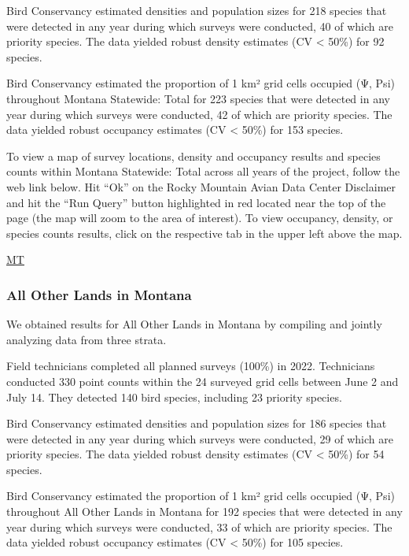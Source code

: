 \documentclass[
  letterpaper,
  DIV=11,
  numbers=noendperiod,
  oneside]{scrreprt}
\begin{document}
Bird Conservancy estimated densities and population sizes for 218
species that were detected in any year during which surveys were
conducted, 40 of which are priority species. The data yielded robust
density estimates (CV \textless{} 50\%) for 92 species.

Bird Conservancy estimated the proportion of 1 km² grid cells occupied
(Ψ, Psi) throughout Montana Statewide: Total for 223 species that were
detected in any year during which surveys were conducted, 42 of which
are priority species. The data yielded robust occupancy estimates (CV
\textless{} 50\%) for 153 species.

To view a map of survey locations, density and occupancy results and
species counts within Montana Statewide: Total across all years of the
project, follow the web link below. Hit ``Ok'' on the Rocky Mountain
Avian Data Center Disclaimer and hit the ``Run Query'' button
highlighted in red located near the top of the page (the map will zoom
to the area of interest). To view occupancy, density, or species counts
results, click on the respective tab in the upper left above the map.

\href{http://www.rmbo.org/new_site/adc/QueryWindow.aspx\#N4IgzgrgDgpgTmALnAhoiBbEAuABCAWQBUQBfIA=}{MT}

\hypertarget{all-other-lands-in-montana}{%
\subsubsection{All Other Lands in
Montana}\label{all-other-lands-in-montana}}

We obtained results for All Other Lands in Montana by compiling and
jointly analyzing data from three strata.

Field technicians completed all planned surveys (100\%) in 2022.
Technicians conducted 330 point counts within the 24 surveyed grid cells
between June 2 and July 14. They detected 140 bird species, including 23
priority species.

Bird Conservancy estimated densities and population sizes for 186
species that were detected in any year during which surveys were
conducted, 29 of which are priority species. The data yielded robust
density estimates (CV \textless{} 50\%) for 54 species.

Bird Conservancy estimated the proportion of 1 km² grid cells occupied
(Ψ, Psi) throughout All Other Lands in Montana for 192 species that were
detected in any year during which surveys were conducted, 33 of which
are priority species. The data yielded robust occupancy estimates (CV
\textless{} 50\%) for 105 species.
\end{document}
